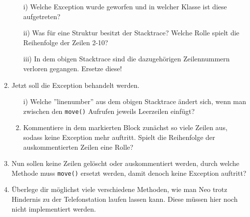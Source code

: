 \begin{enumerate}[label=\alph*)]
\begin{enumerate}
        \item[i)] Welche Exception wurde geworfen und in welcher Klasse ist diese aufgetreten?
        \item[ii)] Was für eine Struktur besitzt der Stacktrace? Welche Rolle spielt die Reihenfolge der Zeilen 2-10? 
        \item[iii)] In dem obigen Stacktrace sind die dazugehörigen Zeilennummern verloren gegangen. Ersetze diese!  
    \end{enumerate}
    \item Jetzt soll die Exception behandelt werden.
    \begin{enumerate}
        \item[i)] Welche ''linenumber'' aus dem obigen Stacktrace ändert sich, wenn man zwischen den \lstinline{move()} Aufrufen jeweils
        Leerzeilen einfügt?  
        \item[ii)] Kommentiere in dem markierten Block zunächst so viele Zeilen aus, sodass keine Exception mehr auftritt. 
        Spielt die Reihenfolge der auskommentierten Zeilen eine Rolle?
    \end{enumerate}
    \item  Nun sollen keine Zeilen gelöscht oder auskommentiert werden, durch welche Methode muss \lstinline{move()} ersetzt werden, damit 
    denoch keine Exception auftritt?
    \item Überlege dir möglichst viele verschiedene Methoden, wie man Neo trotz Hindernis zu der Telefonstation laufen lassen kann. 
    Diese müssen hier noch nicht implementiert werden.
\end{enumerate}
 
